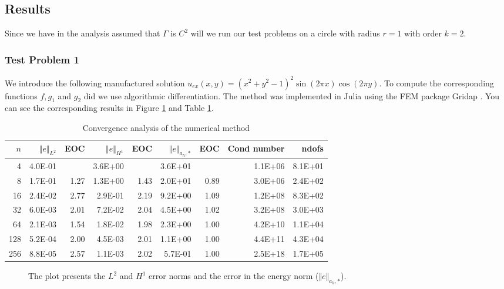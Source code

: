 
\subsection{Results}%
\label{sub:results}

Since we have in the analysis assumed that $\Gamma $ is $C^2 $ will we run our test problems on a circle with radius $r=1$ with order $k=2$.

\subsubsection{Test Problem 1}%
\label{ssub:test_problem_1}


We introduce the following manufactured solution $u_{ex}(x,y) = (x^2 + y^2 - 1)^2 \sin(2\pi x) \cos(2\pi y)$. To compute the corresponding functions $f, g_{1}$ and $g_{2}$ did we use algorithmic differentiation. The method was implemented in Julia
using the FEM package Gridap \cite{verdugo22,julia17}. You can see the corresponding results in Figure \ref{fig:CutFEM_error1} and Table \ref{table:CutFEM_error1}.


\begin{table}[h!]
    \caption{Convergence analysis of the numerical method}
    \label{table:CutFEM_error1}
    \begin{tabular}{rrrrrrrrr}
    \hline\hline
    \textbf{$n$} & \textbf{$\Vert e \Vert_{L^2}$} & \textbf{EOC} & \textbf{$ \Vert e \Vert_{H^1}$} & \textbf{EOC} & \textbf{$\Vert e \Vert_{ a_h,* }$} & \textbf{EOC} & \textbf{Cond number} & \textbf{ndofs} \\\hline
    4 & 4.0E-01 &  & 3.6E+00 &  & 3.6E+01 &  & 1.1E+06 & 8.1E+01 \\
    8 & 1.7E-01 & 1.27 & 1.3E+00 & 1.43 & 2.0E+01 & 0.89 & 3.0E+06 & 2.4E+02 \\
    16 & 2.4E-02 & 2.77 & 2.9E-01 & 2.19 & 9.2E+00 & 1.09 & 1.2E+08 & 8.3E+02 \\
    32 & 6.0E-03 & 2.01 & 7.2E-02 & 2.04 & 4.5E+00 & 1.02 & 3.2E+08 & 3.0E+03 \\
    64 & 2.1E-03 & 1.54 & 1.8E-02 & 1.98 & 2.3E+00 & 1.00 & 4.2E+10 & 1.1E+04 \\
    128 & 5.2E-04 & 2.00 & 4.5E-03 & 2.01 & 1.1E+00 & 1.00 & 4.4E+11 & 4.3E+04 \\
    256 & 8.8E-05 & 2.57 & 1.1E-03 & 2.02 & 5.7E-01 & 1.00 & 2.5E+18 & 1.7E+05 \\\hline\hline
  \end{tabular}
\end{table}


\begin{figure}[h!]
    \centering
    
    \caption{The plot presents the $L^2$ and $H^1$ error norms and the error in the energy norm ($\Vert e \Vert_{a_h,*}$).}
    \label{fig:CutFEM_error1}
\end{figure}

